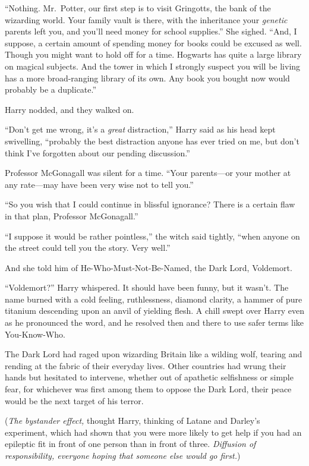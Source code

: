 “Nothing. Mr.~Potter, our first step is to visit Gringotts, the bank of the
wizarding world. Your family vault is there, with the
inheritance your \emph{genetic} parents left you, and you’ll need money for
school supplies.” She sighed. “And, I suppose, a certain amount of spending
money for books could be excused as well. Though you might want to hold off for
a time. Hogwarts has quite a large library on magical subjects. And the tower
in which I strongly suspect you will be living has a more broad-ranging
library of its own. Any book you bought now would probably be a duplicate.”

Harry nodded, and they walked on.

“Don’t get me wrong, it’s a \emph{great} distraction,” Harry said as his head
kept swivelling, “probably the best distraction anyone has ever tried on me,
but don’t think I’ve forgotten about our pending discussion.”

Professor McGonagall was silent for a time.
“Your parents—or your mother at any rate—may
have been very wise not to tell you.”

“So you wish that I could continue in blissful ignorance? There is a certain
flaw in that plan, Professor McGonagall.”

“I suppose it would be rather pointless,” the witch said tightly, “when anyone
on the street could tell you the story. Very well.”

And she told him of He-Who-Must-Not-Be-Named, the Dark Lord, Voldemort.

“Voldemort?” Harry whispered. It should have been funny, but it wasn’t. The
name burned with a cold feeling, ruthlessness, diamond clarity, a hammer of
pure titanium descending upon an anvil of yielding flesh. A chill swept over
Harry even as he pronounced the word, and he resolved then and there to use
safer terms like You-Know-Who.

The Dark Lord had raged upon wizarding Britain like a wilding wolf, tearing and
rending at the fabric of their everyday lives. Other countries had wrung their
hands but hesitated to intervene, whether out of apathetic selfishness or
simple fear, for whichever was first among them to oppose the Dark Lord, their
peace would be the next target of his terror.

(\emph{The bystander effect,} thought Harry, thinking of Latane and Darley’s
experiment, which had shown that you were more likely to get help if you had an
epileptic fit in front of one person than in front of three. \emph{Diffusion of
responsibility, everyone hoping that someone else would go first.})

